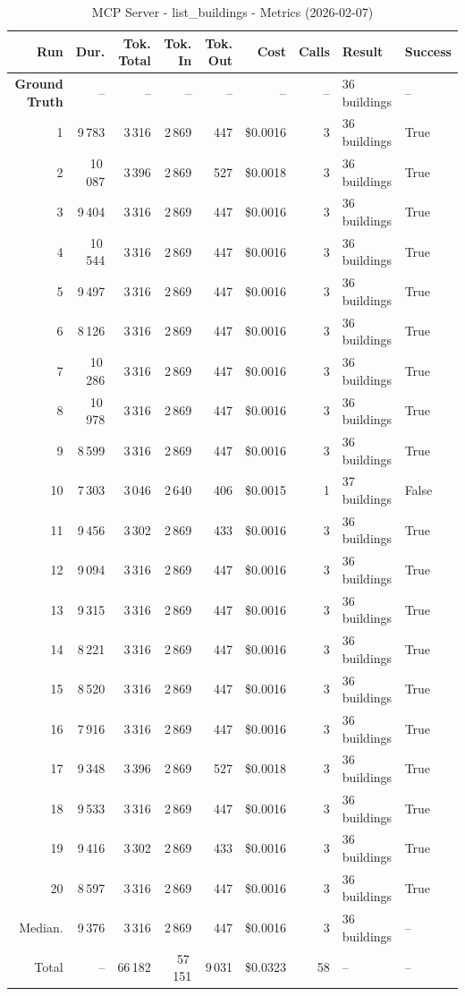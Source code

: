 \documentclass[a4paper,11pt]{article}
\begin{document}
\begin{table}[ht]
\centering
\scriptsize
\caption{MCP Server - list\_buildings - Metrics (2026-02-07)}
\label{tab:mcp\_list\_buildings\_metrics\_2026-02-07}
\begin{tabular}{r r r r r r r p{3cm} l}
\hline
Run & Dur. & Tok. Total & Tok. In & Tok. Out & Cost & Calls & Result & Success \\
\hline
\textbf{Ground Truth} & -- & -- & -- & -- & -- & -- & 36 buildings & -- \\
\hline
1 & 9\,783 & 3\,316 & 2\,869 & 447 & \$0.0016 & 3 & 36 buildings & True \\
2 & 10\,087 & 3\,396 & 2\,869 & 527 & \$0.0018 & 3 & 36 buildings & True \\
3 & 9\,404 & 3\,316 & 2\,869 & 447 & \$0.0016 & 3 & 36 buildings & True \\
4 & 10\,544 & 3\,316 & 2\,869 & 447 & \$0.0016 & 3 & 36 buildings & True \\
5 & 9\,497 & 3\,316 & 2\,869 & 447 & \$0.0016 & 3 & 36 buildings & True \\
6 & 8\,126 & 3\,316 & 2\,869 & 447 & \$0.0016 & 3 & 36 buildings & True \\
7 & 10\,286 & 3\,316 & 2\,869 & 447 & \$0.0016 & 3 & 36 buildings & True \\
8 & 10\,978 & 3\,316 & 2\,869 & 447 & \$0.0016 & 3 & 36 buildings & True \\
9 & 8\,599 & 3\,316 & 2\,869 & 447 & \$0.0016 & 3 & 36 buildings & True \\
10 & 7\,303 & 3\,046 & 2\,640 & 406 & \$0.0015 & 1 & 37 buildings & False \\
11 & 9\,456 & 3\,302 & 2\,869 & 433 & \$0.0016 & 3 & 36 buildings & True \\
12 & 9\,094 & 3\,316 & 2\,869 & 447 & \$0.0016 & 3 & 36 buildings & True \\
13 & 9\,315 & 3\,316 & 2\,869 & 447 & \$0.0016 & 3 & 36 buildings & True \\
14 & 8\,221 & 3\,316 & 2\,869 & 447 & \$0.0016 & 3 & 36 buildings & True \\
15 & 8\,520 & 3\,316 & 2\,869 & 447 & \$0.0016 & 3 & 36 buildings & True \\
16 & 7\,916 & 3\,316 & 2\,869 & 447 & \$0.0016 & 3 & 36 buildings & True \\
17 & 9\,348 & 3\,396 & 2\,869 & 527 & \$0.0018 & 3 & 36 buildings & True \\
18 & 9\,533 & 3\,316 & 2\,869 & 447 & \$0.0016 & 3 & 36 buildings & True \\
19 & 9\,416 & 3\,302 & 2\,869 & 433 & \$0.0016 & 3 & 36 buildings & True \\
20 & 8\,597 & 3\,316 & 2\,869 & 447 & \$0.0016 & 3 & 36 buildings & True \\
\hline
Median. & 9\,376 & 3\,316 & 2\,869 & 447 & \$0.0016 & 3 & 36 buildings & -- \\
Total & -- & 66\,182 & 57\,151 & 9\,031 & \$0.0323 & 58 & -- & -- \\
\hline
\end{tabular}
\end{table}
\end{document}
